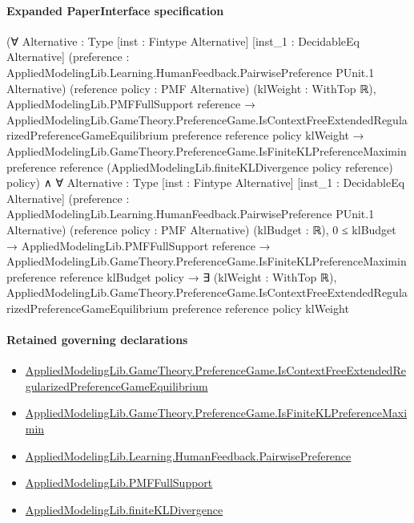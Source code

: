 \documentclass[10pt]{article}
\begin{document}
\paragraph{Expanded PaperInterface specification}
\begin{ReviewVerbatim}
(∀ {Alternative : Type} [inst : Fintype Alternative] [inst_1 : DecidableEq Alternative]
    (preference : AppliedModelingLib.Learning.HumanFeedback.PairwisePreference PUnit.{1} Alternative)
    (reference policy : PMF Alternative) (klWeight : WithTop ℝ),
    AppliedModelingLib.PMFFullSupport reference →
      AppliedModelingLib.GameTheory.PreferenceGame.IsContextFreeExtendedRegularizedPreferenceGameEquilibrium preference
          reference policy klWeight →
        AppliedModelingLib.GameTheory.PreferenceGame.IsFiniteKLPreferenceMaximin preference reference
          (AppliedModelingLib.finiteKLDivergence policy reference) policy) ∧
  ∀ {Alternative : Type} [inst : Fintype Alternative] [inst_1 : DecidableEq Alternative]
    (preference : AppliedModelingLib.Learning.HumanFeedback.PairwisePreference PUnit.{1} Alternative)
    (reference policy : PMF Alternative) (klBudget : ℝ),
    0 ≤ klBudget →
      AppliedModelingLib.PMFFullSupport reference →
        AppliedModelingLib.GameTheory.PreferenceGame.IsFiniteKLPreferenceMaximin preference reference klBudget policy →
          ∃ (klWeight : WithTop ℝ),
            AppliedModelingLib.GameTheory.PreferenceGame.IsContextFreeExtendedRegularizedPreferenceGameEquilibrium
              preference reference policy klWeight
\end{ReviewVerbatim}

\paragraph{Retained governing declarations}
\begin{itemize}\raggedright
\item \hyperlink{governing-declaration-578b1c4cb8565a0d}{Applied\allowbreak{}Modeling\allowbreak{}Lib.\allowbreak{}Game\allowbreak{}Theory.\allowbreak{}Preference\allowbreak{}Game.\allowbreak{}Is\allowbreak{}Context\allowbreak{}Free\allowbreak{}Extended\allowbreak{}Regularized\allowbreak{}Preference\allowbreak{}Game\allowbreak{}Equilibrium}
\item \hyperlink{governing-declaration-d8827c2845a356ad}{Applied\allowbreak{}Modeling\allowbreak{}Lib.\allowbreak{}Game\allowbreak{}Theory.\allowbreak{}Preference\allowbreak{}Game.\allowbreak{}Is\allowbreak{}Finite\allowbreak{}KL\allowbreak{}Preference\allowbreak{}Maximin}
\item \hyperlink{library-prerequisite-7e2db20cf087d9ba}{Applied\allowbreak{}Modeling\allowbreak{}Lib.\allowbreak{}Learning.\allowbreak{}Human\allowbreak{}Feedback.\allowbreak{}Pairwise\allowbreak{}Preference}
\item \hyperlink{library-prerequisite-268c959ee7d2d148}{Applied\allowbreak{}Modeling\allowbreak{}Lib.\allowbreak{}PMF\allowbreak{}Full\allowbreak{}Support}
\item \hyperlink{library-prerequisite-d3573881ae45d4c6}{Applied\allowbreak{}Modeling\allowbreak{}Lib.\allowbreak{}finite\allowbreak{}KL\allowbreak{}Divergence}
\end{itemize}
\end{document}

